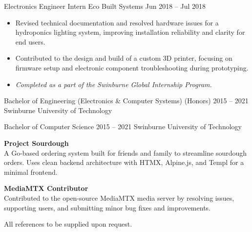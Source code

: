 \documentclass[9pt]{extarticle}
\begin{document}
\begin{minipage}[t]{\textwidth}
	\cvexperience
		{Electronics Engineer Intern}
		{Eco Built Systems}
		{Jun 2018 -- Jul 2018}
		{
			\begin{itemize}[itemsep=0.25em]
				\item Revised technical documentation and resolved hardware issues for a hydroponics lighting system, improving installation reliability and clarity for end users.
				\item Contributed to the design and build of a custom 3D printer, focusing on firmware setup and electronic component troubleshooting during prototyping.
				\item \textit{Completed as a part of the Swinburne Global Internship Program.}
			\end{itemize}
		}
\end{minipage}

\cvbreak


\begin{minipage}[t]{\textwidth}
	\vspace{-\baselineskip}

	\cveducation
		{Bachelor of Engineering (Electronics \& Computer Systems) \normalfont(Honors)}
		{2015 -- 2021}
		{Swinburne University of Technology}

	\cveducation
		{Bachelor of Computer Science}
		{2015 -- 2021}
		{Swinburne University of Technology}
\end{minipage}

\cvbreak


\begin{minipage}[t]{0.75\textwidth}
	\vspace{-\baselineskip}

	
	\textbf{Project Sourdough}\\
	A Go-based ordering system built for friends and family to streamline sourdough orders. Uses clean backend architecture with HTMX, Alpine.js, and Templ for a minimal frontend.

	\vspace{0.5em}

	\textbf{MediaMTX Contributor}\\
	Contributed to the open-source MediaMTX media server by resolving issues, supporting users, and submitting minor bug fixes and improvements.
\end{minipage}
\hfill
\begin{minipage}[t]{0.2\textwidth}
	\vspace{-\baselineskip}

	All references to be supplied upon request.
\end{minipage}
\end{document}
